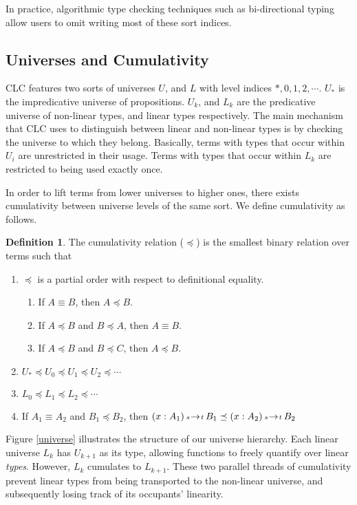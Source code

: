 \documentclass{article}
\theoremstyle{definition}
\newtheorem{definition}{Definition}[section]
\newcommand{\arw}[2]
{\hspace*{0.2em}{\scriptstyle #1}\hspace*{-0.2em}
\rightarrow
\hspace*{-0.2em}{\scriptstyle #2}\hspace*{0.2em}}
\begin{document}
  In practice, algorithmic type checking techniques such as bi-directional typing allow users to omit writing most of these sort indices.

  \subsection{Universes and Cumulativity}
  CLC features two sorts of universes $U$, and $L$ with level indices $*, 0, 1, 2, \cdots$. $U_*$ is the impredicative universe of propositions. $U_k$, and $L_k$ are the predicative universe of non-linear types, and linear types respectively. The main mechanism that CLC uses to distinguish between linear and non-linear types is by checking the universe to which they belong. Basically, terms with types that occur within $U_i$ are unrestricted in their usage. Terms with types that occur within $L_k$ are restricted to being used exactly once.

  In order to lift terms from lower universes to higher ones, there exists cumulativity between universe levels of the same sort. We define cumulativity as follows.

  \begin{definition}
    The cumulativity relation ($\preceq$) is the smallest binary relation over terms such that
    \begin{enumerate}
      \item $\preceq$ is a partial order with respect to definitional equality.
        \begin{enumerate}
          \item If $A \equiv B$, then $A \preceq B$.
          \item If $A \preceq B$ and $B \preceq A$, then $A \equiv B$.
          \item If $A \preceq B$ and $B \preceq C$, then $A \preceq B$.
        \end{enumerate}
      \item $U_* \preceq U_0 \preceq U_1 \preceq U_2 \preceq \cdots$
      \item $L_0 \preceq L_1 \preceq L_2 \preceq \cdots$
      \item If $A_1 \equiv A_2$ and $B_1 \preceq B_2$, then
        $(x : A_1) \arw{s}{t} B_1 \preceq (x : A_2) \arw{s}{t} B_2$
    \end{enumerate}
  \end{definition}

  Figure \ref{universe} illustrates the structure of our universe hierarchy. Each linear universe $L_k$ has $U_{k+1}$ as its type, allowing functions to freely quantify over linear \textit{types}. However, $L_k$ cumulates to $L_{k+1}$. These two parallel threads of cumulativity prevent linear types from being transported to the non-linear universe, and subsequently losing track of its occupants' linearity.
\end{document}
